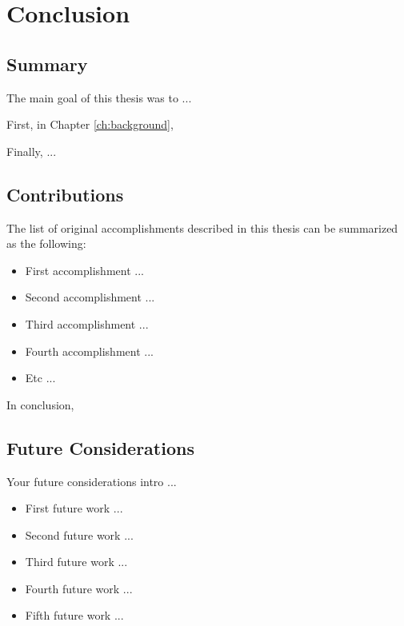 \chapter{Conclusion}\label{ch:Conclusions}

\section{Summary}
The main goal of this thesis was to ...

First, in Chapter \ref{ch:background},  

Finally, ...

\section{Contributions}
 The list of original  accomplishments described in this thesis can be summarized as the following:
 \begin{itemize}
     \item First accomplishment ... 
     
     \item Second accomplishment ...
     
     \item Third accomplishment ...
     
     \item Fourth accomplishment ... 
     
     \item Etc ...
 \end{itemize}
 
 In conclusion, 

\section{Future Considerations}
Your future considerations intro ...

\begin{itemize}

    \item First future work ...
  
    \item Second future work ...
    
    \item Third future work ...
    
    \item Fourth future work ...
    
    \item Fifth future work ... 
    
\end{itemize}

